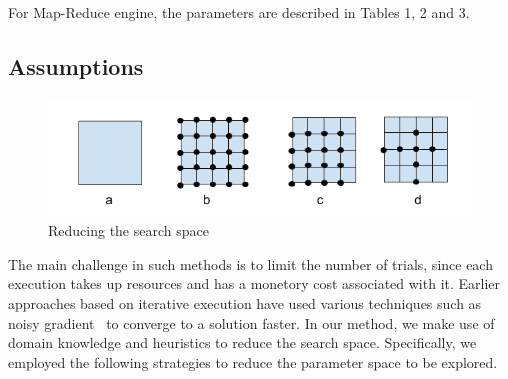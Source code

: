 For Map-Reduce engine, the parameters are described in Tables 1, 2 and 3.

\subsection{Assumptions}

\begin{figure}[h]
	\includegraphics[width=\linewidth]{fig/searchspace.png}
	\caption{Reducing the search space}
	\label{fig:searchspace}
\end{figure}


The main challenge in such methods is to limit the number of trials, since each execution takes up resources and has a monetory cost associated with it. Earlier approaches based on iterative execution have used various techniques such as noisy gradient~\cite{} to converge to a solution faster. In our method, we make use of domain knowledge and heuristics to reduce the search space. Specifically, we employed the following strategies to reduce the parameter space to be explored.

